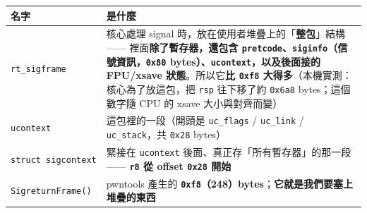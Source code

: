 \documentclass[10pt,a4paper]{article}
\newcounter{none}
\begin{document}
{\def\LTcaptype{none} %
\begin{longtable}[]{@{}
  >{\raggedright\arraybackslash}p{}
  >{\raggedright\arraybackslash}p{}@{}}
\toprule\noalign{}
\begin{minipage}[b]{\linewidth}\raggedright
名字
\end{minipage} & \begin{minipage}[b]{\linewidth}\raggedright
是什麼
\end{minipage} \\
\midrule\noalign{}
\endhead
\bottomrule\noalign{}
\endlastfoot
\texttt{rt\_\allowbreak{}sigframe} & 核心處理 signal
時，放在使用者堆疊上的「\textbf{整包}」結構 ------
裡面\textbf{除了暫存器，還包含
\texttt{pretcode}、\texttt{siginfo}（信號資訊，\texttt{0x80}
bytes）、\texttt{ucontext}，以及後面接的 FPU/xsave
狀態}。所以它\textbf{比 \texttt{0xf8}
大得多}（本機實測：核心為了放這包，把 \texttt{rsp} 往下移了約
\texttt{0x6a8} bytes；這個數字隨 CPU 的 xsave 大小與對齊而變） \\
\texttt{ucontext} & 這包裡的一段（開頭是 \texttt{uc\_\allowbreak{}flags} /
\texttt{uc\_\allowbreak{}link} / \texttt{uc\_\allowbreak{}stack}，共 \texttt{0x28} bytes） \\
\texttt{struct\ \allowbreak{}sigcontext} & 緊接在 \texttt{ucontext}
後面、真正存「所有暫存器」的那一段 ------ \textbf{\texttt{r8} 從 offset
\texttt{0x28} 開始} \\
\texttt{SigreturnFrame()} & pwntools 產生的
\textbf{\texttt{0xf8}（248）bytes}；\textbf{它就是我們要塞上堆疊的東西} \\
\end{longtable}
}
\end{document}

